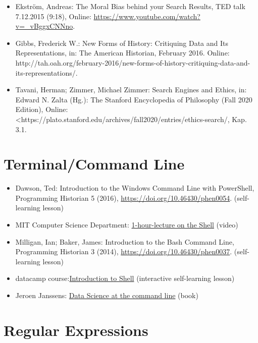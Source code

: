 \documentclass[
  letterpaper,
]{book}
\begin{document}
\begin{itemize}
\item
  Ekström, Andreas: The Moral Bias behind your Search Results, TED talk
  7.12.2015 (9:18), Online:
  \url{https://www.youtube.com/watch?v=_vBggxCNNno}.
\item
  Gibbs, Frederick W.: New Forms of History: Critiquing Data and Its
  Representations, in: The American Historian, February 2016. Online:
  http://tah.oah.org/february-2016/new-forms-of-history-critiquing-data-and-its-representations/.
\item
  Tavani, Herman; Zimmer, Michael Zimmer: Search Engines and Ethics, in:
  Edward N. Zalta (Hg.): The Stanford Encyclopedia of Philosophy (Fall
  2020 Edition), Online:
  \textless https://plato.stanford.edu/archives/fall2020/entries/ethics-search/,
  Kap. 3.1.
\end{itemize}

\hypertarget{terminalcommand-line}{%
\section{Terminal/Command Line}\label{terminalcommand-line}}

\begin{itemize}
\item
  Dawson, Ted: Introduction to the Windows Command Line with PowerShell,
  Programming Historian 5 (2016),
  \url{https://doi.org/10.46430/phen0054}. (self-learning lesson)
\item
  MIT Computer Science Department:
  \href{https://missing.csail.mit.edu/2020/course-shell/}{1-hour-lecture
  on the Shell} (video)
\item
  Milligan, Ian; Baker, James: Introduction to the Bash Command Line,
  Programming Historian 3 (2014),
  \url{https://doi.org/10.46430/phen0037}. (self-learning lesson)
\item
  datacamp
  course:\href{https://app.datacamp.com/learn/courses/introduction-to-shell}{Introduction
  to Shell} (interactive self-learning lesson)
\item
  Jeroen Janssens: \href{https://datascienceatthecommandline.com/}{Data
  Science at the command line} (book)
\end{itemize}

\hypertarget{regular-expressions}{%
\section{Regular Expressions}\label{regular-expressions}}
\end{document}
